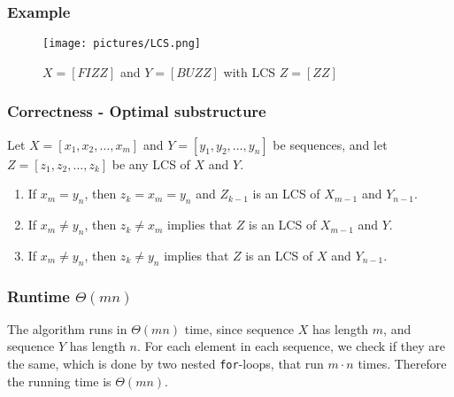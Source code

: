 \subsubsection*{Example}
\begin{figure}[H]
  \texttt{[image: pictures/LCS.png]}
  \caption{$X=[FIZZ]$ and $Y=[BUZZ]$ with LCS $Z=[ZZ]$}
\end{figure}

\subsubsection*{Correctness - Optimal substructure}
Let $X=[x_1,x_2,\dots,x_m]$ and $Y=[y_1,y_2,\dots,y_n]$ be sequences, and let
$Z=[z_1,z_2,\dots,z_k]$ be any LCS of $X$ and $Y$.
\begin{enumerate}
  \item If $x_m=y_n$, then $z_k=x_m=y_n$ and $Z_{k-1}$ is an LCS of $X_{m-1}$
  and $Y_{n-1}$.
  \item If $x_m\neq y_n$, then $z_k\neq x_m$ implies that $Z$ is an LCS of
  $X_{m-1}$ and $Y$.
  \item If $x_m\neq y_n$, then $z_k\neq y_n$ implies that $Z$ is an LCS of $X$
  and $Y_{n-1}$.
\end{enumerate}

\subsubsection*{Runtime $\Theta(mn)$}
The algorithm runs in $\Theta(mn)$ time, since sequence $X$ has length $m$, and
sequence $Y$ has length $n$. For each element in each sequence, we check if
they are the same, which is done by two nested \texttt{for}-loops, that run
$m\cdot n$ times. Therefore the running time is $\Theta(mn)$.
